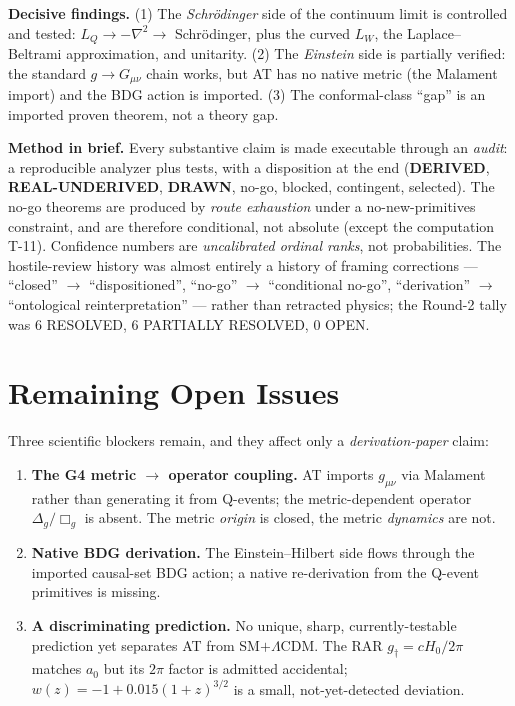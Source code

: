 \documentclass[10pt,a4paper]{article}
\newcommand{\derived}{\textbf{DERIVED}}
\newcommand{\realunder}{\textbf{REAL-UNDERIVED}}
\newcommand{\drawn}{\textbf{DRAWN}}
\begin{document}
\textbf{Decisive findings.} (1) The \emph{Schr\"odinger} side of the continuum limit is
controlled and tested: $L_Q\to-\nabla^2\to$ Schr\"odinger, plus the curved $L_W$, the
Laplace--Beltrami approximation, and unitarity. (2) The \emph{Einstein} side is partially
verified: the standard $g\to G_{\mu\nu}$ chain works, but AT has no native metric (the
Malament import) and the BDG action is imported. (3) The conformal-class ``gap'' is an
imported proven theorem, not a theory gap.

\textbf{Method in brief.} Every substantive claim is made executable through an
\emph{audit}: a reproducible analyzer plus tests, with a disposition at the end
(\derived, \realunder, \drawn, no-go, blocked, contingent, selected). The no-go theorems
are produced by \emph{route exhaustion} under a no-new-primitives constraint, and are
therefore conditional, not absolute (except the computation T-11). Confidence numbers are
\emph{uncalibrated ordinal ranks}, not probabilities. The hostile-review history was almost
entirely a history of framing corrections --- ``closed'' $\to$ ``dispositioned'',
``no-go'' $\to$ ``conditional no-go'', ``derivation'' $\to$ ``ontological
reinterpretation'' --- rather than retracted physics; the Round-2 tally was 6 RESOLVED,
6 PARTIALLY RESOLVED, 0 OPEN.

\section{Remaining Open Issues}

Three scientific blockers remain, and they affect only a \emph{derivation-paper} claim:

\begin{enumerate}
\item \textbf{The G4 metric $\to$ operator coupling.} AT imports $g_{\mu\nu}$ via
Malament rather than generating it from Q-events; the metric-dependent operator
$\Delta_g/\Box_g$ is absent. The metric \emph{origin} is closed, the metric
\emph{dynamics} are not.
\item \textbf{Native BDG derivation.} The Einstein--Hilbert side flows through the
imported causal-set BDG action; a native re-derivation from the Q-event primitives is
missing.
\item \textbf{A discriminating prediction.} No unique, sharp, currently-testable prediction
yet separates AT from SM$+\Lambda$CDM. The RAR $g_\dagger=cH_0/2\pi$ matches $a_0$ but its
$2\pi$ factor is admitted accidental; $w(z)=-1+0.015(1+z)^{3/2}$ is a small, not-yet-detected
deviation.
\end{enumerate}
\end{document}
